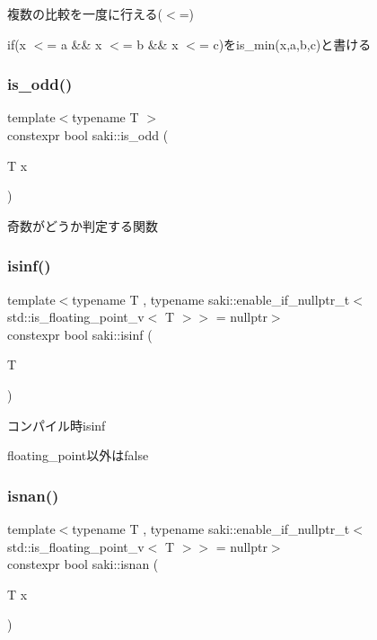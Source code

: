 複数の比較を一度に行える($<$=) 

if(x $<$= a \&\& x $<$= b \&\& x $<$= c)をis\+\_\+min(x,a,b,c)と書ける \mbox{\label{namespacesaki_a03cf21b9e2231e956f8da966f1e09d70}} 
\subsubsection{\texorpdfstring{is\+\_\+odd()}{is\_odd()}}
{\footnotesize\ttfamily template$<$typename T $>$ \\
constexpr bool saki\+::is\+\_\+odd (\begin{DoxyParamCaption}\item[{T}]{x }\end{DoxyParamCaption})}



奇数がどうか判定する関数 

\mbox{\label{namespacesaki_a2168418bb30a857d2d018d0d05c7ace0}} 
\subsubsection{\texorpdfstring{isinf()}{isinf()}}
{\footnotesize\ttfamily template$<$typename T , typename saki\+::enable\+\_\+if\+\_\+nullptr\+\_\+t$<$ std\+::is\+\_\+floating\+\_\+point\+\_\+v$<$ T $>$$>$  = nullptr$>$ \\
constexpr bool saki\+::isinf (\begin{DoxyParamCaption}\item[{T}]{ }\end{DoxyParamCaption})}



コンパイル時isinf 

floating\+\_\+point以外はfalse \mbox{\label{namespacesaki_a446ca3f39e4dc8e57db4aafa03a4e232}} 
\subsubsection{\texorpdfstring{isnan()}{isnan()}}
{\footnotesize\ttfamily template$<$typename T , typename saki\+::enable\+\_\+if\+\_\+nullptr\+\_\+t$<$ std\+::is\+\_\+floating\+\_\+point\+\_\+v$<$ T $>$$>$  = nullptr$>$ \\
constexpr bool saki\+::isnan (\begin{DoxyParamCaption}\item[{T}]{x }\end{DoxyParamCaption})}



